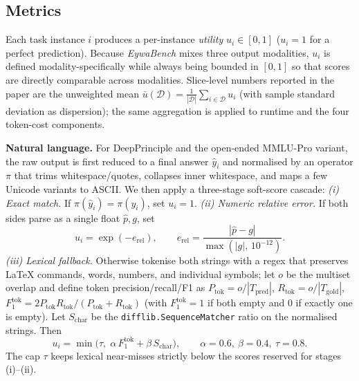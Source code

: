 \documentclass{llmxive}
\begin{document}
{\subsection{Metrics}
\label{sec:metrics}

Each task instance $i$ produces a per-instance \emph{utility} $u_i \in [0,1]$ ($u_i{=}1$ for a perfect prediction). Because \textit{EywaBench} mixes three output modalities, $u_i$ is defined modality-specifically while always being bounded in $[0,1]$ so that scores are directly comparable across modalities. Slice-level numbers reported in the paper are the unweighted mean $\bar{u}(\mathcal{D}) = \tfrac{1}{|\mathcal{D}|}\sum_{i\in\mathcal{D}} u_i$ (with sample standard deviation as dispersion); the same aggregation is applied to runtime and the four token-cost components.

\textbf{Natural language.}
For DeepPrinciple and the open-ended MMLU-Pro variant, the raw output is first reduced to a final answer $\hat{y}_i$ and normalised by an operator $\pi$ that trims whitespace/quotes, collapses inner whitespace, and maps a few Unicode variants to ASCII. We then apply a three-stage soft-score cascade:
\emph{(i) Exact match.} If $\pi(\hat{y}_i)=\pi(y_i)$, set $u_i{=}1$.
\emph{(ii) Numeric relative error.} If both sides parse as a single float $\hat{p},g$, set
\begin{equation}
u_i = \exp(-e_{\mathrm{rel}}), \qquad e_{\mathrm{rel}} = \frac{|\hat{p}-g|}{\max(|g|,\,10^{-12})}.
\label{eq:nl_numeric}
\end{equation}
\emph{(iii) Lexical fallback.} Otherwise tokenise both strings with a regex that preserves \LaTeX{} commands, words, numbers, and individual symbols; let $o$ be the multiset overlap and define token precision/recall/F1 as $P_\mathrm{tok}{=}o/|T_\mathrm{pred}|$, $R_\mathrm{tok}{=}o/|T_\mathrm{gold}|$, $F_1^{\mathrm{tok}}{=}2P_\mathrm{tok}R_\mathrm{tok}/(P_\mathrm{tok}{+}R_\mathrm{tok})$ (with $F_1^{\mathrm{tok}}{=}1$ if both empty and $0$ if exactly one is empty). Let $S_\mathrm{char}$ be the \texttt{difflib.SequenceMatcher} ratio on the normalised strings. Then
\begin{equation}
u_i = \min\!\bigl(\tau,\; \alpha\,F_1^{\mathrm{tok}} + \beta\,S_\mathrm{char}\bigr), \qquad \alpha{=}0.6,\ \beta{=}0.4,\ \tau{=}0.8.
\label{eq:nl_textual}
\end{equation}
The cap $\tau$ keeps lexical near-misses strictly below the scores reserved for stages (i)--(ii).

}
\end{document}
